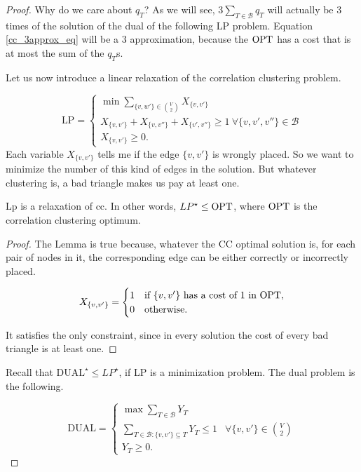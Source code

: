 \begin{proof}
	Why do we care about $q_T$? As we will see, $3\sum_{T \in \mathcal{B}} q_T$  will actually be 3 times of the solution of the dual of the following LP problem. Equation \ref{cc_3approx_eq} will be a 3 approximation, because the $\text{OPT}$ has a cost that is at most the sum of the $q_T$s.
	
	Let us now introduce a linear relaxation of the correlation clustering problem.
	
	\begin{equation}
	\text{LP} =\begin{cases}
	\min \sum_{\{v, w'\} \in \binom{V}{2}} X_{\{v, v'\}}\\
	X_{\{v, v'\}} + X_{\{v, v''\}} + X_{\{v', v''\}} \geq 1\ \forall \{v, v', v''\} \in \mathcal{B}\\
	X_{\{v, v'\}} \geq 0.
	\end{cases}
	\end{equation}
	Each variable $X_{\{v, v'\}}$ tells me if the edge $\{v, v'\}$ is wrongly placed. So we want to minimize the number of this kind of edges in the solution. But whatever clustering is, a bad triangle makes us pay at least one.
	\begin{lem}
		Lp is a relaxation of cc. In other words, $LP^\star \leq \text{OPT}$, where $\text{OPT}$ is the correlation clustering optimum.
	\end{lem}
	
	\begin{proof}
		 The Lemma is true because, whatever the CC optimal solution is, for each pair of nodes in it, the corresponding edge can be either correctly or incorrectly placed.
		 	
		\begin{equation}
		X_{\{v, v'\}} = \begin{cases}
		1 & \text{if $\{v, v'\}$ has a cost of 1 in } \text{OPT},\\
		0 & \text{otherwise.}
		\end{cases}
		\end{equation}
		
		It satisfies the only constraint, since in every solution the cost of every bad triangle is at least one.
	\end{proof}

	Recall that $\text{DUAL}^\star \leq LP^\star$, if LP is a minimization problem. The dual problem is the following.
	
	\begin{equation} \text{DUAL} =
	\begin{cases}
	\max \sum_{T \in \mathcal{B}} Y_T\\
	\sum_{T \in \mathcal{B} : 	\{v, v'\} \subseteq T} Y_T \leq 1 & \forall \{v, v'\} \in \binom{V}{2}\\
	Y_T \geq 0.
	\end{cases}
	\end{equation}
	

\end{proof}
